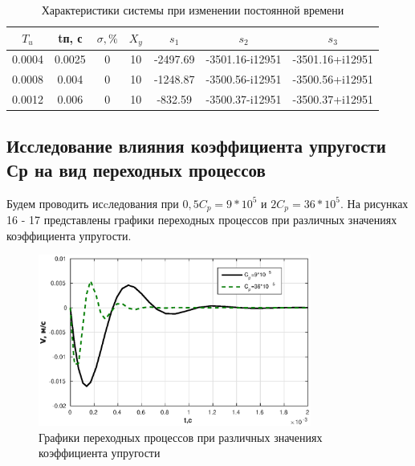 \documentclass[12pt, a4paper]{article}
\begin{document}
\begin{table}[h!]
\centering
\begin{threeparttable}
\caption{Характеристики системы при изменении постоянной времени}
\renewcommand{\arraystretch}{1.8}
\begin{tabular}{ |c|c|c|c|c|c|c|} 
 \hline
 $T_{u}$ & tп, с & $\sigma, \%$ & $X_{y}$ & $s_{1}$ & $s_{2}$ & $s_{3}$ \\ 
 \hline
 0.0004 & 0.0025  & 0 & 10 & -2497.69 & -3501.16-i12951 & -3501.16+i12951\\ 
 \hline
 0.0008 & 0.004 & 0 & 10 & -1248.87 & -3500.56-i12951 & -3500.56+i12951 \\ 
 \hline
 0.0012 & 0.006 & 0 & 10 & -832.59 & -3500.37-i12951 & -3500.37+i12951 \\ 
 \hline
\end{tabular}
\end{threeparttable}
\end{table} 
 
 \newpage
\begin{center}
\section{Исследование влияния коэффициента упругости Ср на вид переходных процессов} 
\end{center}
 \par
Будем проводить исcледования при $0,5C_{p}=9*10^5$ и $2C_{p}=36*10^5$.
На рисунках 16 - 17 представлены графики переходных процессов при различных значениях коэффициента упругости.
\begin{figure}[H]
\centering
\includegraphics[width =0.8\textwidth]{1/V4.eps}
\caption{Графики переходных процессов при различных значениях  коэффициента упругости}
\end{figure}
\end{document}

